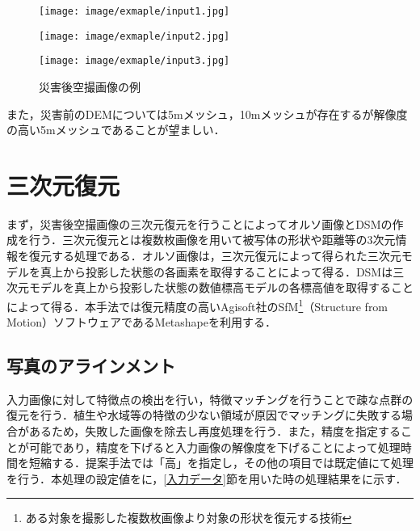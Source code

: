     \begin{figure}[t]
      \begin{minipage}[c]{0.3\hsize}
        \centering
        \texttt{[image: image/exmaple/input1.jpg]}
        \label{入力画像例1}
      \end{minipage}
      \begin{minipage}[c]{0.3\hsize}
        \centering
        \texttt{[image: image/exmaple/input2.jpg]}
        \label{入力画像例2}
      \end{minipage}
      \begin{minipage}[c]{0.3\hsize}
        \centering
        \texttt{[image: image/exmaple/input3.jpg]}
        \label{入力画像例3}
      \end{minipage}
      \caption{災害後空撮画像の例}
      \label{空撮画像例}
    \end{figure}

    また，災害前のDEMについては5mメッシュ，10mメッシュが存在するが解像度の高い5mメッシュであることが望ましい．


  \section{三次元復元}
    まず，災害後空撮画像の三次元復元を行うことによってオルソ画像とDSMの作成を行う．三次元復元とは複数枚画像を用いて被写体の形状や距離等の3次元情報を復元する処理である．オルソ画像は，三次元復元によって得られた三次元モデルを真上から投影した状態の各画素を取得することによって得る．DSMは三次元モデルを真上から投影した状態の数値標高モデルの各標高値を取得することによって得る．本手法では復元精度の高いAgisoft社のSfM\footnote{ある対象を撮影した複数枚画像より対象の形状を復元する技術}（Structure from Motion）ソフトウェアであるMetashape\cite{Metashape}を利用する．

    \subsection{写真のアラインメント}
      \label{写真のアラインメント}
      入力画像に対して特徴点の検出を行い，特徴マッチングを行うことで疎な点群の復元を行う．植生や水域等の特徴の少ない領域が原因でマッチングに失敗する場合があるため，失敗した画像を除去し再度処理を行う．また，精度を指定することが可能であり，精度を下げると入力画像の解像度を下げることによって処理時間を短縮する．提案手法では「高」を指定し，その他の項目では既定値にて処理を行う．本処理の設定値をに，\ref{入力データ}節を用いた時の処理結果をに示す．

